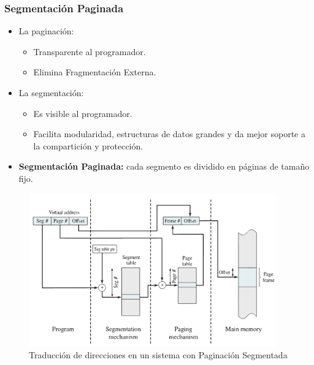 \subsubsection{Segmentación Paginada}
\begin{itemize}
    \item La paginación:
    \begin{itemize}
        \item Transparente al programador.
        \item Elimina Fragmentación Externa.
    \end{itemize}
    \item La segmentación:
    \begin{itemize}
        \item Es visible al programador.
        \item Facilita modularidad, estructuras de datos grandes y da mejor soporte a la compartición y protección.
    \end{itemize}
    \item \textbf{Segmentación Paginada:} cada segmento es dividido en páginas de tamaño fijo.
\end{itemize}
\begin{figure}[h]
    \begin{center}
        \includegraphics[width=0.95\textwidth]{assets/SegmentacionPaginada.pdf}
    \end{center}
    \caption{Traducción de direcciones en un sistema con Paginación Segmentada}\label{fig:}
\end{figure}

